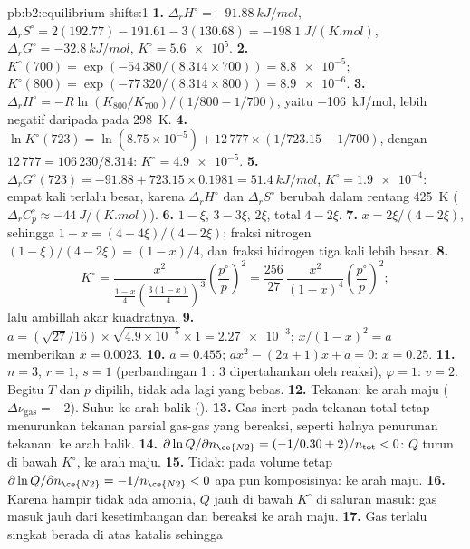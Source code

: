 \begin{solution}{pb:b2:equilibrium-shifts:1}
\textbf{1.} $\Delta_r H^\circ = \qty{-91.88}{kJ/mol}$, $\Delta_r S^\circ =
2(192.77) - 191.61 - 3(130.68) = \qty{-198.1}{J/(K.mol)}$, $\Delta_r G^\circ =
\qty{-32.8}{kJ/mol}$, $K^\circ = \num{5.6e5}$.
\textbf{2.} $K^\circ(700) = \exp(-54\,380/(8.314 \times 700)) = \num{8.8e-5}$;
$K^\circ(800) = \exp(-77\,320/(8.314 \times 800)) = \num{8.9e-6}$.
\textbf{3.} $\Delta_r H^\circ = -R\ln(K_{800}/K_{700})/(1/800 - 1/700)$,
yaitu \qty{-106}{kJ/mol}, lebih negatif daripada pada \qty{298}{K}.
\textbf{4.} $\ln K^\circ(723) = \ln(8.75 \times 10^{-5}) + 12\,777 \times
(1/723.15 - 1/700)$, dengan $12\,777 = 106\,230/8.314$: $K^\circ =
\num{4.9e-5}$.
\textbf{5.} $\Delta_r G^\circ(723) = -91.88 + 723.15 \times 0.1981 =
\qty{51.4}{kJ/mol}$, $K^\circ = \num{1.9e-4}$: empat kali terlalu besar,
karena $\Delta_r H^\circ$ dan $\Delta_r S^\circ$ berubah dalam rentang
\qty{425}{K} ($\Delta_r C_p^\circ \approx \qty{-44}{J/(K.mol)}$).
\textbf{6.}  $1 - \xi$,  $3 - 3\xi$,  $2\xi$, total $4 -
2\xi$.
\textbf{7.} $x = 2\xi/(4 - 2\xi)$, sehingga $1 - x = (4 - 4\xi)/(4 - 2\xi)$;
fraksi nitrogen $(1 - \xi)/(4 - 2\xi) = (1 - x)/4$, dan fraksi hidrogen
tiga kali lebih besar.
\textbf{8.}
\[
  K^\circ = \frac{x^2}{\frac{1-x}{4}\left(\frac{3(1-x)}{4}\right)^3}
  \left(\frac{p^\circ}{p}\right)^2 = \frac{256}{27}\,\frac{x^2}{(1 - x)^4}
  \left(\frac{p^\circ}{p}\right)^2 ;
\]
lalu ambillah akar kuadratnya.
\textbf{9.} $a = (\sqrt{27}/16) \times \sqrt{4.9 \times 10^{-5}} \times 1 =
\num{2.27e-3}$; $x/(1 - x)^2 = a$ memberikan $x = 0.0023$.
\textbf{10.} $a = 0.455$; $ax^2 - (2a + 1)x + a = 0$: $x = 0.25$.
\textbf{11.} $n = 3$, $r = 1$, $s = 1$ (perbandingan 1 : 3 dipertahankan
oleh reaksi), $\varphi = 1$: $v = 2$. Begitu $T$ dan $p$ dipilih, tidak ada
lagi yang bebas.
\textbf{12.} Tekanan: ke arah maju ($\Delta\nu_{\text{gas}} = -2$). Suhu:
ke arah balik ().
\textbf{13.} Gas inert pada tekanan total tetap menurunkan tekanan parsial
gas-gas yang bereaksi, seperti halnya penurunan tekanan: ke arah balik.
\textbf{14.} $\partial\ln Q/\partial n_{\ce{N2}} = (-1/0.30 + 2)/n_{\text{tot}} < 0$:
$Q$ turun di bawah $K^\circ$, ke arah maju.
\textbf{15.} Tidak: pada volume tetap $\partial\ln Q/\partial n_{\ce{N2}} =
-1/n_{\ce{N2}} < 0$ apa pun komposisinya: ke arah maju.
\textbf{16.} Karena hampir tidak ada amonia, $Q$ jauh di bawah $K^\circ$ di
saluran masuk: gas masuk jauh dari kesetimbangan dan bereaksi ke arah
maju.
\textbf{17.} Gas terlalu singkat berada di atas katalis sehingga

\end{solution}
